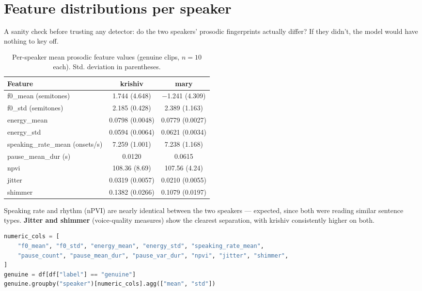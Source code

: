 \documentclass[11pt]{article}
\begin{document}
\section{Feature distributions per speaker}

A sanity check before trusting any detector: do the two speakers'
prosodic fingerprints actually differ? If they didn't, the model would
have nothing to key off.

\begin{table}[h!]
\centering
\caption{Per-speaker mean prosodic feature values (genuine clips, $n=10$ each). Std. deviation in parentheses.}
\label{tab:feature-summary}
\small
\begin{tabular}{lcc}
\toprule
Feature & krishiv & mary \\
\midrule
f0\_mean (semitones) & 1.744 (4.648) & $-$1.241 (4.309) \\
f0\_std (semitones) & 2.185 (0.428) & 2.389 (1.163) \\
energy\_mean & 0.0798 (0.0048) & 0.0779 (0.0027) \\
energy\_std & 0.0594 (0.0064) & 0.0621 (0.0034) \\
speaking\_rate\_mean (onsets/s) & 7.259 (1.001) & 7.238 (1.168) \\
pause\_mean\_dur (s) & 0.0120 & 0.0615 \\
npvi & 108.36 (8.69) & 107.56 (4.24) \\
jitter & 0.0319 (0.0057) & 0.0210 (0.0055) \\
shimmer & 0.1382 (0.0266) & 0.1079 (0.0197) \\
\bottomrule
\end{tabular}
\end{table}

Speaking rate and rhythm (nPVI) are nearly identical between the two
speakers — expected, since both were reading similar sentence types.
\textbf{Jitter and shimmer} (voice-quality measures) show the clearest
separation, with krishiv consistently higher on both.

\begin{lstlisting}[language=Python]
numeric_cols = [
    "f0_mean", "f0_std", "energy_mean", "energy_std", "speaking_rate_mean",
    "pause_count", "pause_mean_dur", "pause_var_dur", "npvi", "jitter", "shimmer",
]
genuine = df[df["label"] == "genuine"]
genuine.groupby("speaker")[numeric_cols].agg(["mean", "std"])
\end{lstlisting}
\end{document}
